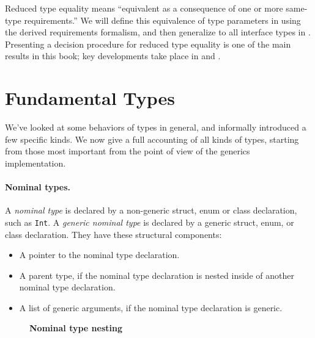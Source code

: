 \documentclass[../generics]{subfiles}
\begin{document}
Reduced type equality means ``equivalent as a consequence of one or more same-type requirements.'' We will define this equivalence of type parameters in  using the derived requirements formalism, and then generalize to all interface types in . Presenting a decision procedure for reduced type equality is one of the main results in this book; key developments take place in  and .

\section{Fundamental Types}\label{fundamental types}

We've looked at some behaviors of types in general, and informally introduced a few specific kinds. We now give a full accounting of all kinds of types, starting from those most important from the point of view of the generics implementation.

\paragraph{Nominal types.}
A \emph{nominal type} is declared by a non-generic struct, enum or class declaration, such as \texttt{Int}. A \emph{generic nominal type} is declared by a generic struct, enum, or class declaration. They have these structural components:
\begin{itemize}
\item A pointer to the nominal type declaration.
\item A parent type, if the nominal type declaration is nested inside of another nominal type declaration.
\item A list of generic arguments, if the nominal type declaration is generic.
\end{itemize}

\begin{figure}
\begin{center}\textbf{Nominal type nesting}\end{center}
\end{figure}
\end{document}
